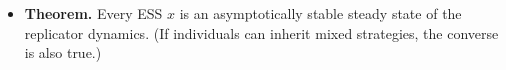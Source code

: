 \documentclass[20pt]{extarticle}
\begin{document}




\begin{itemize}
\item \textbf{Theorem.} Every ESS $x$ is an asymptotically stable steady state of the replicator dynamics. (If individuals can inherit mixed strategies, the converse is also true.)
\end{itemize}
\end{document}
